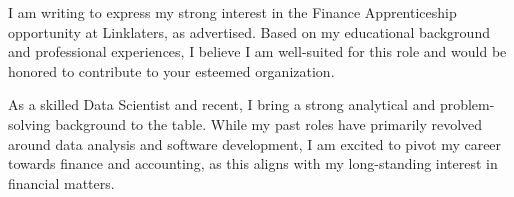 \documentclass[../main.tex]{subfiles}
\begin{document}
\begin{cvletter}






\makelettertitle

\begin{cvletter}

I am writing to express my strong interest in the Finance Apprenticeship opportunity at Linklaters, as advertised. Based on my educational background and professional experiences, I believe I am well-suited for this role and would be honored to contribute to your esteemed organization.

As a skilled Data Scientist and recent, I bring a strong analytical and problem-solving background to the table. While my past roles have primarily revolved around data analysis and software development, I am excited to pivot my career towards finance and accounting, as this aligns with my long-standing interest in financial matters.


\end{cvletter}
\end{cvletter}
\end{document}
